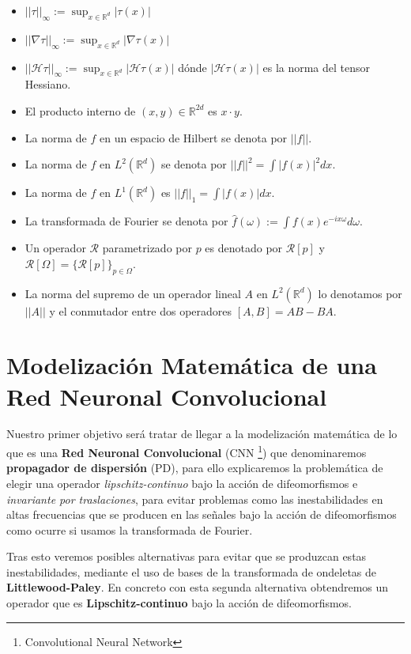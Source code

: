 \begin{itemize}
    \item $|| \tau ||_\infty := \sup_{x \in \mathbb{R}^d} |\tau(x)|$
    \item $||\nabla \tau ||_\infty := \sup_{x \in \mathbb{R}^d} |\nabla \tau(x)|$
    \item $||\mathcal{H} \tau ||_\infty := \sup_{x \in \mathbb{R}^d} |\mathcal{H} \tau(x)|$ dónde $|\mathcal{H} \tau(x)|$ es la norma del tensor Hessiano. 
    \item El producto interno de $(x,y) \in \mathbb{R}^{2d}$ es $x\cdot y$.
    \item La norma de $f$ en un espacio de Hilbert se denota por $||f||$.
    \item La norma de $f$ en $L^2(\mathbb{R}^d)$ se denota por $||f||^2=\int{|f(x)|^2 dx}$.
    \item La norma de $f$ en $L^1(\mathbb{R}^d)$ es $||f||_1=\int{|f(x)| dx}$.
    \item La transformada de Fourier se denota por $\widehat{f}(\omega):= \int{f(x)e^{-ix\omega}d\omega}$.
    \item Un operador  $\mathcal{R}$ parametrizado por $p$ es denotado por $\mathcal{R}[p]$ y $\mathcal{R}[\Omega]=\lbrace \mathcal{R}[p] \rbrace_{p \in \Omega}$. 
    \item La norma del supremo de un operador lineal $A$ en $L^2(\mathbb{R}^d)$ lo denotamos por $||A||$ y el conmutador entre dos operadores $[A,B]=AB-BA$.
\end{itemize}

\section{Modelización Matemática de una Red Neuronal Convolucional} \label{ch:seccion12}

\noindent Nuestro primer objetivo será tratar de llegar a la modelización matemática de lo que es una \textbf{Red Neuronal Convolucional} (CNN \footnote{Convolutional Neural Network}) que denominaremos \textbf{propagador de dispersión} (PD), para ello explicaremos la problemática de elegir una operador \textit{lipschitz-continuo} bajo la acción de difeomorfismos e \textit{invariante por traslaciones}, para evitar problemas como las inestabilidades en altas frecuencias que se producen en las señales bajo la acción de difeomorfismos como ocurre si usamos la transformada de Fourier. 

\medskip

\noindent Tras esto  veremos posibles alternativas para evitar que se produzcan estas inestabilidades, mediante el uso de bases de la transformada de ondeletas de \textbf{Littlewood-Paley}. En concreto con esta segunda alternativa obtendremos un operador que es \textbf{Lipschitz-continuo} bajo la acción de difeomorfismos. 

